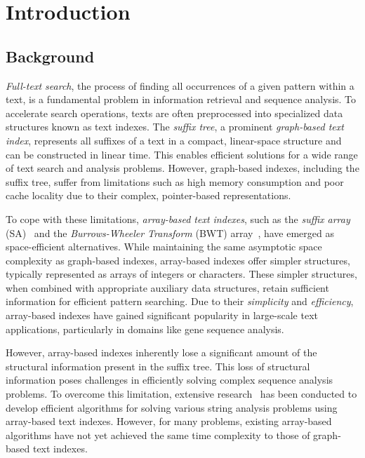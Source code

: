 \section{Introduction}

\subsection{Background}
\textit{Full-text search}, the process of finding all occurrences of a given pattern within a text, is a fundamental problem in information retrieval and sequence analysis. To accelerate search operations, texts are often preprocessed into specialized data structures known as text indexes. The \textit{suffix tree}, a prominent \textit{graph-based text index}, represents all suffixes of a text in a compact, linear-space structure and can be constructed in linear time. This enables efficient solutions for a wide range of text search and analysis problems. However, graph-based indexes, including the suffix tree, suffer from limitations such as high memory consumption and poor cache locality due to their complex, pointer-based representations.

To cope with 
these limitations, \textit{array-based text indexes}, such as the \textit{suffix array} (SA)~\cite{manber:myers1993suffixarrays} and the \textit{Burrows-Wheeler Transform} (BWT) array~\cite{burrows:wheeler1994blocksorting,Ferragina05:FM}, have emerged as space-efficient alternatives. While maintaining the same asymptotic space complexity as graph-based indexes, array-based indexes offer simpler structures, typically represented as arrays of integers or characters. These simpler structures, when combined with appropriate auxiliary data structures, retain sufficient information for efficient pattern searching. Due to their \textit{simplicity} and \textit{efficiency}, array-based indexes have gained significant popularity in large-scale text applications, particularly in domains like gene sequence analysis.

However, array-based indexes inherently lose a significant amount of the structural information present in the suffix tree. This loss of structural information poses challenges in efficiently solving complex sequence analysis problems. To overcome this limitation, extensive research~\cite{kasai:lee2001lcp:linear,abouelhoda2004replacing,narisawa2007efficient,beller:berger2012space:efficient:bbo,belazzougui:cunial2017representing,belazzougui2020linear,nishimoto:cpm2021enum} has been conducted to develop efficient algorithms for solving various string analysis problems using array-based text indexes. 
However, for many problems, existing array-based algorithms have not yet achieved 
the same time complexity to those of graph-based text indexes. 

